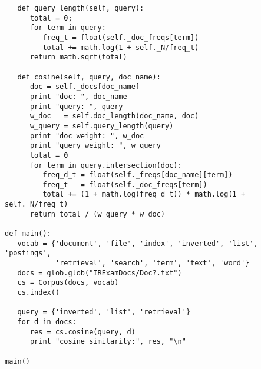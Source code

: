 \documentclass[11pt]{article}
\begin{document}
\begin{verbatim}
   def query_length(self, query):
      total = 0;
      for term in query:
         freq_t = float(self._doc_freqs[term])
         total += math.log(1 + self._N/freq_t)
      return math.sqrt(total)

   def cosine(self, query, doc_name):
      doc = self._docs[doc_name]
      print "doc: ", doc_name
      print "query: ", query 
      w_doc   = self.doc_length(doc_name, doc)
      w_query = self.query_length(query)
      print "doc weight: ", w_doc
      print "query weight: ", w_query
      total = 0
      for term in query.intersection(doc):
         freq_d_t = float(self._freqs[doc_name][term])
         freq_t   = float(self._doc_freqs[term])
         total += (1 + math.log(freq_d_t)) * math.log(1 + self._N/freq_t)
      return total / (w_query * w_doc)

def main():
   vocab = {'document', 'file', 'index', 'inverted', 'list', 'postings',
            'retrieval', 'search', 'term', 'text', 'word'}
   docs = glob.glob("IRExamDocs/Doc?.txt")
   cs = Corpus(docs, vocab)
   cs.index()

   query = {'inverted', 'list', 'retrieval'}
   for d in docs:
      res = cs.cosine(query, d)
      print "cosine similarity:", res, "\n"

main()
\end{verbatim}
\end{document}
